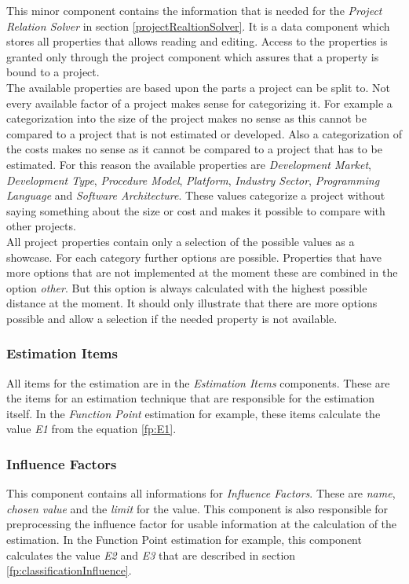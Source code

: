 This minor component contains the information that is needed for the \textit{Project Relation Solver} in section \ref{projectRealtionSolver}. It is a data component which stores all properties that allows reading and editing. Access to the properties is granted only through the project component which assures that a property is bound to a project.\\
The available properties are based upon the parts a project can be split to. Not every available factor of a project makes sense for categorizing it. For example a categorization into the size of the project makes no sense as this cannot be compared to a project that is not estimated or developed. Also a categorization of the costs makes no sense as it cannot be compared to a project that has to be estimated. For this reason the available properties are \textit{Development Market}, \textit{Development Type}, \textit{Procedure Model}, \textit{Platform}, \textit{Industry Sector}, \textit{Programming Language} and \textit{Software Architecture}. These values categorize a project without saying something about the size or cost and makes it possible to compare with other projects.\\
All project properties contain only a selection of the possible values as a showcase. For each category further options are possible. Properties that have more options that are not implemented at the moment these are combined in the option \textit{other}. But this option is always calculated with the highest possible distance at the moment. It should only illustrate that there are more options possible and allow a selection if the needed property is not available.
\subsubsection{Estimation Items}

All items for the estimation are in the \textit{Estimation Items} components. These are the items for an estimation technique that are responsible for the estimation itself. In the \textit{Function Point} estimation for example, these items calculate the value \textit{E1} from the equation \ref{fp:E1}.

\subsubsection{Influence Factors}

This component contains all informations for \textit{Influence Factors}. These are \textit{name}, \textit{chosen value} and the \textit{limit} for the value. This component is also responsible for preprocessing the influence factor for usable information at the calculation of the estimation. In the Function Point estimation for example, this component calculates the value \textit{E2} and \textit{E3} that are described in section \ref{fp:classificationInfluence}.

